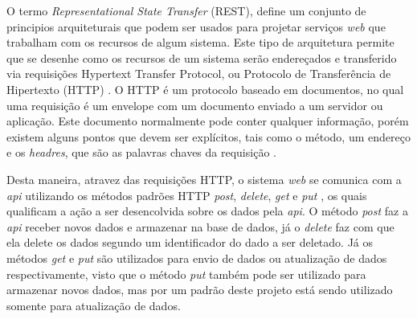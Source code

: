 	O termo \textit{Representational State Transfer} (REST), define um conjunto de principios arquiteturais que podem ser usados para projetar serviços \textit{web} que trabalham com os recursos de algum sistema. Este tipo de arquitetura permite que se desenhe como os recursos de um sistema serão endereçados e transferido via requisições Hypertext Transfer Protocol, ou Protocolo de Transferência de Hipertexto (HTTP) \cite{Rodriguez2008}. O HTTP é um protocolo baseado em documentos, no qual uma requisição é um envelope com um documento enviado a um servidor ou aplicação. Este documento normalmente pode conter qualquer informação, porém existem alguns pontos que devem ser explícitos, tais como o método, um endereço e os \textit{headres}, que são as palavras chaves da requisição \cite{Masse2011}.

    Desta maneira, atravez das requisições HTTP, o sistema \textit{web} se comunica com a \textit{api} utilizando os métodos padrões HTTP \textit{post}, \textit{delete}, \textit{get} e \textit{put} \cite{Rodriguez2008}, os quais qualificam a ação a ser desencolvida sobre os dados pela \textit{api}. O método \textit{post} faz a \textit{api} receber novos dados e armazenar na base de dados, já o \textit{delete} faz com que ela delete os dados segundo um identificador do dado a ser deletado. Já os métodos \textit{get} e \textit{put} são utilizados para envio de dados ou atualização de dados respectivamente, visto que o método \textit{put} também pode ser utilizado para armazenar novos dados, mas por um padrão deste projeto está sendo utilizado somente para atualização de dados.

   
    
